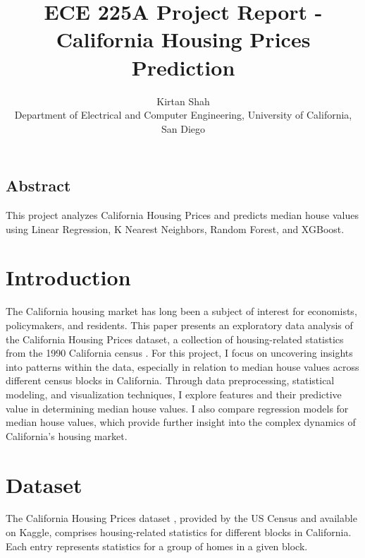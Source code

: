 \documentclass[letterpaper,twocolumn,10pt]{article}
\begin{document}
\date{}

\title{\Large \bf ECE 225A Project Report - California Housing Prices Prediction}

\author{
{\rm Kirtan Shah}\\
Department of Electrical and Computer Engineering, University of California, San Diego
}

\maketitle

\thispagestyle{empty}


\subsection*{Abstract}

This project analyzes California Housing Prices and predicts median house values using Linear Regression, K Nearest Neighbors, Random Forest, and XGBoost. 

\section{Introduction}
The California housing market has long been a subject of interest for economists, policymakers, and residents. 
This paper presents an exploratory data analysis of the California Housing Prices dataset, a collection of housing-related statistics from the 1990 California census \cite{kaggleCaliforniaHousing}.
For this project, I focus on uncovering insights into patterns within the data, especially in relation to median house values across different census blocks in California. 
Through data preprocessing, statistical modeling, and visualization techniques, I explore features and their predictive value in determining median house values.
I also compare regression models for median house values, which provide further insight into the complex dynamics of California's housing market.


\section{Dataset}
The California Housing Prices dataset \cite{kaggleCaliforniaHousing}, provided by the US Census and available on Kaggle, comprises housing-related statistics for different blocks in California.
Each entry represents statistics for a group of homes in a given block.
\end{document}
